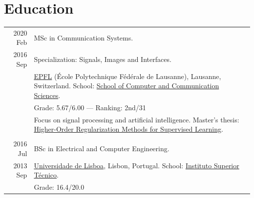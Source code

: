 \documentclass[a4paper,11pt]{article}
\newcommand{\sectionTergar}{}
\newcommand{\sectionTergar}{
      \phantom{5}2023 Sep &
      Course in Philosophy and Meditation. \\
      Present &  \footnotesize{Tergar Institute, Kathmandu, Nepal.} \\
      & \footnotesize{ 
        Head Teacher: Mingyur Rinpoche. Project: \href{https://joaquimcampos.com/madhyamaka}{Communicating Emptiness}. The course will continue on-site between mid-September and mid-December 2024.
      } \\
      \multicolumn{2}{c}{} \\
    }
\begin{document}
  \vspace{12pt}

  \section{Education}

    \begin{tabular}{r|p{13cm}}

      \sectionTergar

      2020 Feb  &
      MSc in Communication Systems. \\
      2016 Sep & Specialization: Signals, Images and Interfaces. \\
      & \footnotesize{\href{https://www.epfl.ch/en/}{EPFL} (École Polytechnique Fédérale de Lausanne), Lausanne, Switzerland. \newline
      School: \href{https://www.epfl.ch/schools/ic/}{School of Computer and Communication Sciences}.
      } \\
      & \footnotesize{
      Grade: 5.67/6.00} — Ranking: 2nd/31 \\
      & \footnotesize{
        Focus on signal processing and artificial intelligence. \newline
        Master's thesis: \href{https://www.joaquimcampos.com/assets/pubs/MSc_thesis.pdf}{Higher-Order Regularization Methods for Supervised Learning}. 
      } \\
      \multicolumn{2}{c}{} \\

      \phantom{5}2016 Jul &
      BSc in Electrical and Computer Engineering. \\
      2013 Sep &  \footnotesize{
        \href{https://www.ulisboa.pt/en}{Universidade de Lisboa}, Lisbon, Portugal. \newline
        School: \href{https://tecnico.ulisboa.pt/en/}{Instituto Superior Técnico}.
      } \\
      & \footnotesize{Grade: 16.4/20.0}
    \end{tabular}
\end{document}
